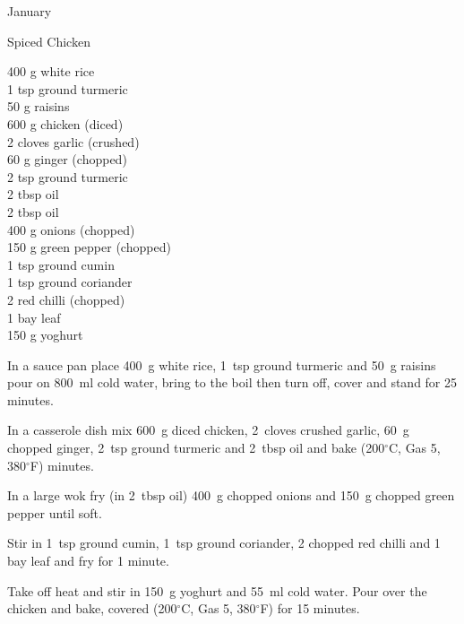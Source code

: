 \begin{menu}{January}
    \begin{recipe}{2}{Spiced Chicken}%
		\begin{ingredients}
		400 g white rice  \\
	1 tsp ground turmeric  \\
	50 g raisins  \\
	600 g chicken (diced) \\
	2 cloves garlic (crushed) \\
	60 g ginger (chopped) \\
	2 tsp ground turmeric  \\
	2 tbsp oil  \\
	2 tbsp oil  \\
	400 g onions (chopped) \\
	150 g green pepper (chopped) \\
	1 tsp ground cumin  \\
	1 tsp ground coriander  \\
	2  red chilli (chopped) \\
	1  bay leaf  \\
	150 g yoghurt  \\
	
		\end{ingredients}
	
	
    \begin{instructions}
    \item 
    In a
    sauce pan
    place
    400~g  white rice,
    1~tsp  ground turmeric
    and
    50~g  raisins
    pour on
    800~ml  cold water,
    bring to the boil then turn off, cover and stand for 25 minutes.
  \item 
        In a casserole dish mix
        600~g diced chicken,
        2~cloves crushed garlic,
        60~g chopped ginger,
        2~tsp  ground turmeric and
        2~tbsp  oil
        and
        bake (200$^{\circ}$C, Gas 5, 380$^{\circ}$F) minutes.
      \item 
        In a large wok fry
        (in 2~tbsp  oil)
        400~g chopped onions
        and
        150~g chopped green pepper
        until soft.
      \item 
        Stir in
        1~tsp  ground cumin,
        1~tsp  ground coriander,
        2 chopped red chilli
        and
        1  bay leaf
        and fry for 1 minute.
      \item 
        Take off heat
        and
        stir in
        150~g  yoghurt
        and
        55~ml  cold water.
        Pour over the chicken
        and bake,
        covered (200$^{\circ}$C, Gas 5, 380$^{\circ}$F) for 15 minutes.
      

\end{instructions}
\end{recipe}
\end{menu}
